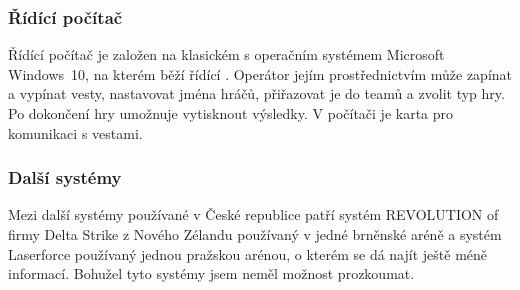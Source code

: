 \subsubsection{Řídící počítač}
Řídící počítač je založen na klasickém  s operačním systémem Microsoft Windows~10, na kterém běží řídící . Operátor jejím prostřednictvím může zapínat a vypínat vesty, nastavovat jména hráčů, přiřazovat je do teamů a zvolit typ hry. Po dokončení hry umožnuje  vytisknout výsledky. V počítači je  karta pro komunikaci s vestami.


\subsubsection{Další systémy}
Mezi další systémy používané v České republice patří systém REVOLUTION of firmy Delta Strike z Nového Zélandu používaný v jedné brněnské aréně a systém Laserforce používaný jednou pražskou arénou, o kterém se dá najít ještě méně informací. Bohužel tyto systémy jsem neměl možnost prozkoumat.

